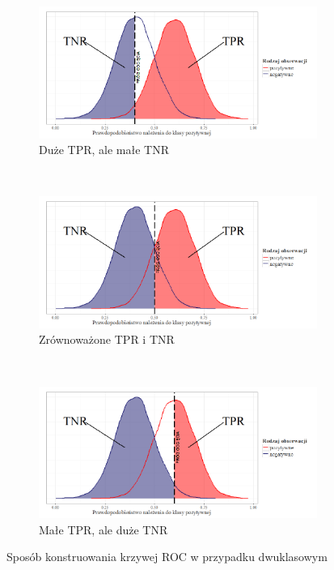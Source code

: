 \documentclass{mini}
\begin{document}
\begin{figure}[!htbp]
	\begin{center}
  \begin{subfigure}[h]{\textwidth}
    \includegraphics[width=\textwidth]{graphics/roc1.png}
    \caption{Duże TPR, ale małe TNR}
    \label{fig:f11}
  \end{subfigure}\\
  \begin{subfigure}[h]{\textwidth}
    \includegraphics[width=\textwidth]{graphics/roc2.png}
    \caption{Zrównoważone TPR i TNR}
    \label{fig:f22}
  \end{subfigure}\\
  \begin{subfigure}[h]{\textwidth}
    \includegraphics[width=\textwidth]{graphics/roc3.png}
    \caption{Małe TPR, ale duże TNR}
    \label{fig:f22}
  \end{subfigure}
  \end{center}
  \caption{Sposób konstruowania krzywej ROC w przypadku dwuklasowym}
  \label{wszystkietrzy}
\end{figure}
\end{document}
